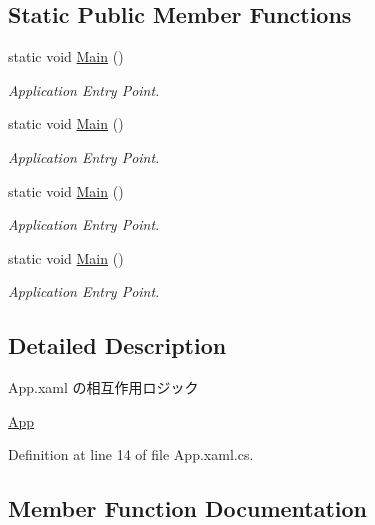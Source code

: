 \subsection*{Static Public Member Functions}
\begin{DoxyCompactItemize}
\item 
static void \hyperlink{class_reversi_wpf_1_1_app_a21f38c0f40a47a04302edeeb7bf005f8}{Main} ()
\begin{DoxyCompactList}\small\item\em Application Entry Point. \end{DoxyCompactList}\item 
static void \hyperlink{class_reversi_wpf_1_1_app_a21f38c0f40a47a04302edeeb7bf005f8}{Main} ()
\begin{DoxyCompactList}\small\item\em Application Entry Point. \end{DoxyCompactList}\item 
static void \hyperlink{class_reversi_wpf_1_1_app_a21f38c0f40a47a04302edeeb7bf005f8}{Main} ()
\begin{DoxyCompactList}\small\item\em Application Entry Point. \end{DoxyCompactList}\item 
static void \hyperlink{class_reversi_wpf_1_1_app_a21f38c0f40a47a04302edeeb7bf005f8}{Main} ()
\begin{DoxyCompactList}\small\item\em Application Entry Point. \end{DoxyCompactList}\end{DoxyCompactItemize}


\subsection{Detailed Description}
App.\+xaml の相互作用ロジック 

\hyperlink{class_reversi_wpf_1_1_app}{App} 

Definition at line 14 of file App.\+xaml.\+cs.



\subsection{Member Function Documentation}
\mbox{\label{class_reversi_wpf_1_1_app_a30ccf063a596c89bd03747d60a96d084}} 
